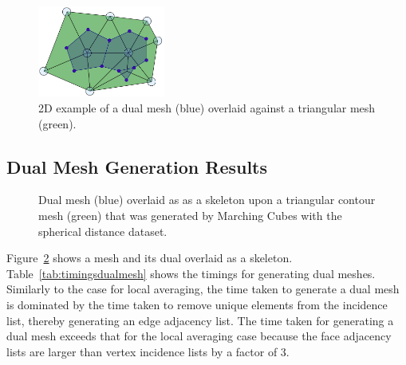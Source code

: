 \documentclass[review,journal]{vgtc}         %
\begin{document}
\begin{figure}[!tb]
\begin{center}
\includegraphics[height=3cm]{DualExample.pdf}
\end{center}
\caption{2D example of a dual mesh (blue) overlaid against a triangular mesh (green).}
\label{fig:DualExample}
\end{figure}

\subsection{Dual Mesh Generation Results}

\begin{figure}[!b]
\begin{center}
\setlength\fboxsep{0pt}
\end{center}
\caption{Dual mesh (blue) overlaid as as a skeleton upon a triangular contour mesh (green) that was generated by Marching Cubes with the spherical distance dataset.}
\label{fig:DualMeshSkeleton}
\end{figure}
Figure~\ref{fig:DualMeshSkeleton} shows a mesh and its dual overlaid as a skeleton. Table~\ref{tab:timingsdualmesh} shows the timings for generating dual meshes. Similarly to the case for local averaging, the time taken to generate a dual mesh is dominated by the time taken to remove unique elements from the incidence list, thereby generating an edge adjacency list. The time taken for generating a dual mesh exceeds that for the local averaging case because the face adjacency lists are larger than vertex incidence lists by a factor of 3. 
\end{document}
